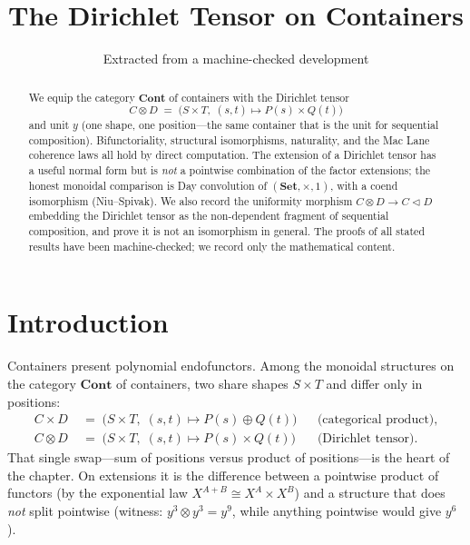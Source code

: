 \documentclass[11pt,a4paper]{article}
\title{The Dirichlet Tensor on Containers}
\author{Extracted from a machine-checked development}
\date{}
\theoremstyle{plain}
\theoremstyle{definition}
\newcommand{\Cont}{\mathbf{Cont}}
\newcommand{\seq}{\mathbin{\triangleleft}}
\newcommand{\Dir}{\mathbin{\otimes}}
\begin{document}
\maketitle

\begin{abstract}
We equip the category $\Cont$ of containers with the Dirichlet tensor
\[
  C \Dir D
  \;=\;
  \bigl(S \times T,\; (s,t) \mapsto P(s) \times Q(t)\bigr)
\]
and unit $y$ (one shape, one position---the same container that is the
unit for sequential composition). Bifunctoriality, structural
isomorphisms, naturality, and the Mac Lane coherence laws all hold by
direct computation. The extension of a Dirichlet tensor has a useful
normal form but is \emph{not} a pointwise combination of the factor
extensions; the honest monoidal comparison is Day convolution of
$(\mathbf{Set}, \times, 1)$, with a coend isomorphism (Niu--Spivak). We
also record the uniformity morphism $C \Dir D \to C \seq D$ embedding
the Dirichlet tensor as the non-dependent fragment of sequential
composition, and prove it is not an isomorphism in general. The proofs
of all stated results have been machine-checked; we record only the
mathematical content.
\end{abstract}

\tableofcontents
\bigskip

\section{Introduction}

Containers present polynomial endofunctors. Among the monoidal structures
on the category $\Cont$ of containers, two share shapes $S \times T$ and
differ only in positions:
\begin{align}
  C \times D
  &\;=\;
  \bigl(S \times T,\; (s,t) \mapsto P(s) \oplus Q(t)\bigr)
  &&\text{(categorical product)}, \\
  C \Dir D
  &\;=\;
  \bigl(S \times T,\; (s,t) \mapsto P(s) \times Q(t)\bigr)
  &&\text{(Dirichlet tensor)}.
\end{align}
That single swap---sum of positions versus product of positions---is the
heart of the chapter. On extensions it is the difference between a
pointwise product of functors (by the exponential law
$X^{A+B} \cong X^A \times X^B$) and a structure that does \emph{not}
split pointwise (witness: $y^3 \Dir y^3 = y^9$, while anything pointwise
would give $y^6$).
\end{document}
